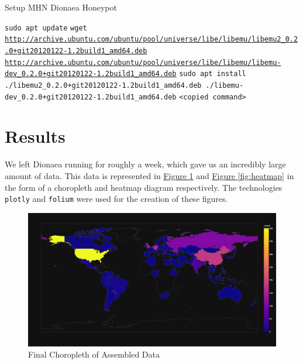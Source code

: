 \documentclass[12pt,usenames,dvipsnames]{iopart}
\newcommand{\reffig}[1]{\hyperref[#1]{Figure \ref*{#1}}}
\begin{document}
\begin{algorithm}[h]
\caption{Setup MHN Dionaea Honeypot}\label{alg:dionaea}
\begin{algorithmic}[1]
\State \texttt{sudo apt update}
\State \texttt{wget \url{http://archive.ubuntu.com/ubuntu/pool/universe/libe/libemu/libemu2_0.2.0+git20120122-1.2build1_amd64.deb} \url{http://archive.ubuntu.com/ubuntu/pool/universe/libe/libemu/libemu-dev_0.2.0+git20120122-1.2build1_amd64.deb}}
\State \texttt{sudo apt install ./libemu2\_0.2.0+git20120122-1.2build1\_amd64.deb ./libemu-dev\_0.2.0+git20120122-1.2build1\_amd64.deb} 
\State \texttt{<copied command>}
\end{algorithmic}
\end{algorithm}

\section{Results} \label{sec-results}

We left Dionaea running for roughly a week, which gave us an incredibly large amount of data. This data is represented in \reffig{fig:choropleth} and \reffig{fig:heatmap} in the form of a choropleth and heatmap diagram respectively. The technologies \texttt{plotly} and \texttt{folium} were used for the creation of these figures.


\begin{figure}[h]
    \centering
    \includegraphics[width=\textwidth]{images/choropleth.png}
    \caption{Final Choropleth of Assembled Data}
    \label{fig:choropleth}
\end{figure}
\end{document}
